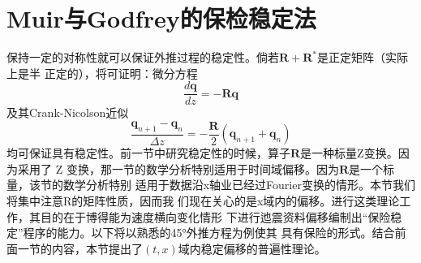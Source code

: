 \section{Muir与Godfrey的保检稳定法}
\label{sec:4.8}

保持一定的对称性就可以保证外推过程的稳定性。倘若$\mathbf{R}+\mathbf{R^*}$是正定矩阵（实际上是半
正定的），将可证明：微分方程
\begin{equation}
\frac{d\mathbf{q}}{dz}=-\mathbf{Rq}
\label{eq:ex4.8.1}
\end{equation}
及其Crank-Nicolson近似
\begin{equation}
\frac{\mathbf{q}_{n+1}-\mathbf{q}_n}{\Delta z}=-\frac{\mathbf{R}}{2}(\mathbf{q}_{n+1}+\mathbf{q}_n)
\label{eq:ex4.8.2}
\end{equation}
均可保证具有稳定性。前一节中研究稳定性的时候，算子$\mathbf{R}$是一种标量Z变换。因为采用了
Z
变换，那一节的数学分析特别适用于时间域偏移。因为$\mathbf{R}$是一个标量，该节的数学分析特别
适用于数据沿x轴业已经过Fourier变换的情形。本节我们将集中注意R的矩阵性质，因而我
们现在关心的是x域内的偏移。进行这类理论工作，其目的在于博得能为速度横向变化情形
下进行迆震资料偏移编制出“保险稳定”程序的能力。以下将以熟悉的45°外推方程为例使其
具有保险的形式。结合前面一节的内容，本节提出了$(t,x)$域内稳定偏移的普遍性理论。





